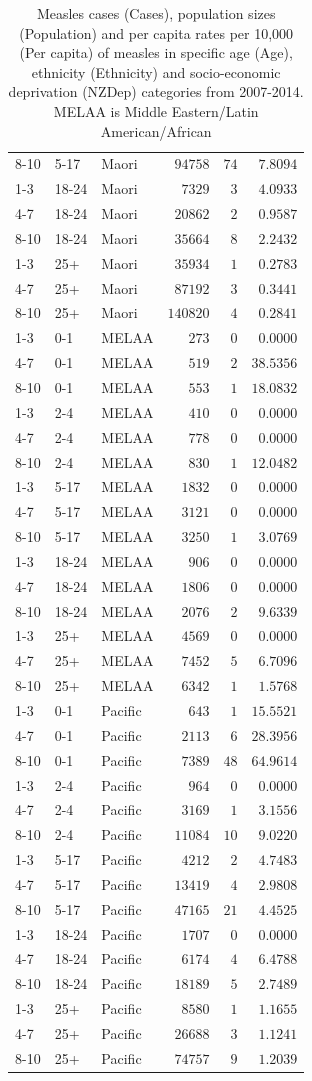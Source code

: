 \documentclass{article}
\begin{document}
\begin{table}[hbtp]
\begin{center}
\begin{tabular}{lllrrr}
8-10&5-17&Maori&$ 94758$&$ 74$&$ 7.8094$\tabularnewline
1-3&18-24&Maori&$  7329$&$  3$&$ 4.0933$\tabularnewline
4-7&18-24&Maori&$ 20862$&$  2$&$ 0.9587$\tabularnewline
8-10&18-24&Maori&$ 35664$&$  8$&$ 2.2432$\tabularnewline
1-3&25+&Maori&$ 35934$&$  1$&$ 0.2783$\tabularnewline
4-7&25+&Maori&$ 87192$&$  3$&$ 0.3441$\tabularnewline
8-10&25+&Maori&$140820$&$  4$&$ 0.2841$\tabularnewline
1-3&0-1&MELAA&$   273$&$  0$&$ 0.0000$\tabularnewline
4-7&0-1&MELAA&$   519$&$  2$&$38.5356$\tabularnewline
8-10&0-1&MELAA&$   553$&$  1$&$18.0832$\tabularnewline
1-3&2-4&MELAA&$   410$&$  0$&$ 0.0000$\tabularnewline
4-7&2-4&MELAA&$   778$&$  0$&$ 0.0000$\tabularnewline
8-10&2-4&MELAA&$   830$&$  1$&$12.0482$\tabularnewline
1-3&5-17&MELAA&$  1832$&$  0$&$ 0.0000$\tabularnewline
4-7&5-17&MELAA&$  3121$&$  0$&$ 0.0000$\tabularnewline
8-10&5-17&MELAA&$  3250$&$  1$&$ 3.0769$\tabularnewline
1-3&18-24&MELAA&$   906$&$  0$&$ 0.0000$\tabularnewline
4-7&18-24&MELAA&$  1806$&$  0$&$ 0.0000$\tabularnewline
8-10&18-24&MELAA&$  2076$&$  2$&$ 9.6339$\tabularnewline
1-3&25+&MELAA&$  4569$&$  0$&$ 0.0000$\tabularnewline
4-7&25+&MELAA&$  7452$&$  5$&$ 6.7096$\tabularnewline
8-10&25+&MELAA&$  6342$&$  1$&$ 1.5768$\tabularnewline
1-3&0-1&Pacific&$   643$&$  1$&$15.5521$\tabularnewline
4-7&0-1&Pacific&$  2113$&$  6$&$28.3956$\tabularnewline
8-10&0-1&Pacific&$  7389$&$ 48$&$64.9614$\tabularnewline
1-3&2-4&Pacific&$   964$&$  0$&$ 0.0000$\tabularnewline
4-7&2-4&Pacific&$  3169$&$  1$&$ 3.1556$\tabularnewline
8-10&2-4&Pacific&$ 11084$&$ 10$&$ 9.0220$\tabularnewline
1-3&5-17&Pacific&$  4212$&$  2$&$ 4.7483$\tabularnewline
4-7&5-17&Pacific&$ 13419$&$  4$&$ 2.9808$\tabularnewline
8-10&5-17&Pacific&$ 47165$&$ 21$&$ 4.4525$\tabularnewline
1-3&18-24&Pacific&$  1707$&$  0$&$ 0.0000$\tabularnewline
4-7&18-24&Pacific&$  6174$&$  4$&$ 6.4788$\tabularnewline
8-10&18-24&Pacific&$ 18189$&$  5$&$ 2.7489$\tabularnewline
1-3&25+&Pacific&$  8580$&$  1$&$ 1.1655$\tabularnewline
4-7&25+&Pacific&$ 26688$&$  3$&$ 1.1241$\tabularnewline
8-10&25+&Pacific&$ 74757$&$  9$&$ 1.2039$\tabularnewline
\hline
\end{tabular}\end{center}\caption{Measles cases (Cases), population sizes (Population) and per capita rates per 10,000 (Per capita) of measles in specific age (Age), ethnicity (Ethnicity) and socio-economic deprivation (NZDep) categories from 2007-2014. MELAA is Middle Eastern/Latin American/African}
\label{table:percap}
\end{table}
\end{document}
